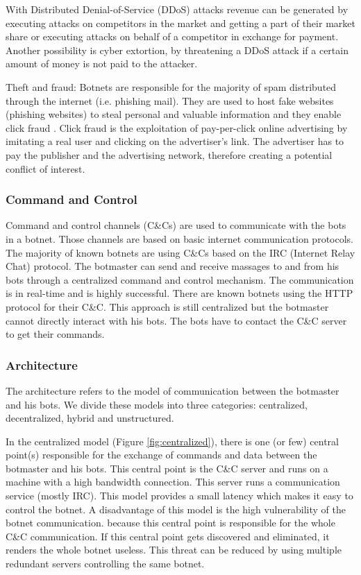 With Distributed Denial-of-Service (DDoS) attacks revenue can be generated by executing attacks on competitors in the market and getting a part of their market share or executing attacks on behalf of a competitor in exchange for payment.
Another possibility is cyber extortion, by threatening a DDoS attack if a certain amount of money is not paid to the attacker.

Theft and fraud: Botnets are responsible for the majority of spam distributed through the internet (i.e. phishing mail). They are used to host fake websites (phishing websites) to steal personal and valuable information and they enable click fraud \cite{vanEeten08}. Click fraud is the exploitation of pay-per-click online advertising by imitating a real user and clicking on the advertiser's link. The advertiser has to pay the publisher and the advertising network, therefore creating a potential conflict of interest.

		\subsubsection{Command and Control}
Command and control channels (C\&Cs) are used to communicate with the bots in a botnet. Those channels are based on basic internet communication protocols. The majority of known botnets are using C\&Cs based on the IRC (Internet Relay Chat) protocol. The botmaster can send and receive massages to and from his bots through a centralized command and control mechanism. The communication is in real-time and is highly successful. There are known botnets using the HTTP protocol for their C\&C. This approach is still centralized but the botmaster cannot directly interact with his bots. The bots have to contact the C\&C server to get their commands. \cite{Gu08}

		\subsubsection{Architecture}
The architecture refers to the model of communication between the botmaster and his bots. We divide these models into three categories: centralized, decentralized, hybrid and unstructured.

In the centralized model (Figure \ref{fig:centralized}), there is one (or few) central point(s) responsible for the exchange of commands and data between the botmaster and his bots. This central point is the C\&C server and runs on a machine with a high bandwidth connection. This server runs a communication service (mostly IRC). This model provides a small latency which makes it easy to control the botnet. A disadvantage of this model is the high vulnerability of the botnet communication. because this central point is responsible for the whole C\&C communication. If this central point gets discovered and eliminated, it renders the whole botnet useless. This threat can be reduced by using multiple redundant servers controlling the same botnet. \cite{Zeidanloo09}

